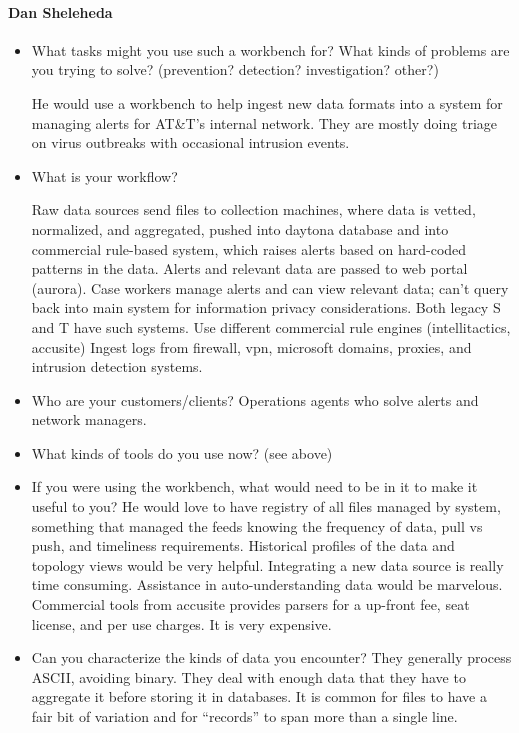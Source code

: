 \documentclass{article}
\begin{document}
\paragraph*{Dan Sheleheda}
\begin{itemize}

\item  What tasks might you use such a workbench for?  What kinds of
  problems are you trying to solve? (prevention? detection?
  investigation? other?) 

He would use a workbench to help ingest new data formats into a system
for managing alerts for AT\&T's internal network.  They are mostly doing
triage on virus outbreaks with occasional intrusion events.  

\item What is your workflow?

Raw data sources send files to collection machines, where data is
vetted, normalized, and aggregated, pushed into daytona database and
into commercial rule-based system, which raises alerts based on
hard-coded patterns in the data.  Alerts and relevant data are passed
to web portal (aurora). Case workers manage alerts and can view
relevant data; can't query back into main system for information
privacy considerations.  Both legacy S and T have such systems.  Use
different commercial rule engines (intellitactics, accusite) Ingest
logs from firewall, vpn, microsoft domains, proxies, and intrusion
detection systems.


\item Who are your customers/clients?  
Operations agents who solve alerts and network managers.

\item What kinds of tools do you use now?   (see above)


\item If you were using the workbench, what would need to be in it to make it useful to you?
He would love to have registry of all files managed by system,
something that managed the feeds knowing the frequency of data, pull
vs push, and timeliness requirements. Historical profiles of the data
and topology views would be very helpful.  Integrating a new data
source is really time consuming.  Assistance in auto-understanding
data would be marvelous.  Commercial tools from accusite provides
parsers for a up-front fee, seat license, and per use charges.  It is
very expensive.


\item Can you characterize the kinds of data you encounter?
They generally process ASCII, avoiding binary.  They deal with enough
data that they have to aggregate it before storing it in databases. It
is common for files to have a fair bit of variation and for
``records'' to span more than a single line.



\end{itemize}
\end{document}
